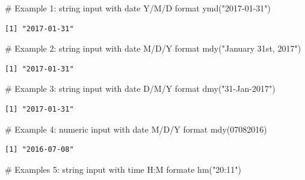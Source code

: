 \documentclass[
  letterpaper,
  DIV=11,
  numbers=noendperiod]{scrartcl}
\newenvironment{Shaded}{\begin{snugshade}}{\end{snugshade}}
\newcommand{\CommentTok}[1]{\textcolor[rgb]{0.37,0.37,0.37}{#1}}
\newcommand{\DecValTok}[1]{\textcolor[rgb]{0.68,0.00,0.00}{#1}}
\newcommand{\FunctionTok}[1]{\textcolor[rgb]{0.28,0.35,0.67}{#1}}
\newcommand{\NormalTok}[1]{\textcolor[rgb]{0.00,0.23,0.31}{#1}}
\newcommand{\StringTok}[1]{\textcolor[rgb]{0.13,0.47,0.30}{#1}}
\begin{document}
\begin{Shaded}
\begin{Highlighting}[]
\CommentTok{\# Example 1: string input with date Y/M/D format}
\FunctionTok{ymd}\NormalTok{(}\StringTok{"2017{-}01{-}31"}\NormalTok{)}
\end{Highlighting}
\end{Shaded}

\begin{verbatim}
[1] "2017-01-31"
\end{verbatim}

\begin{Shaded}
\begin{Highlighting}[]
\CommentTok{\# Example 2: string input with date M/D/Y format}
\FunctionTok{mdy}\NormalTok{(}\StringTok{"January 31st, 2017"}\NormalTok{)}
\end{Highlighting}
\end{Shaded}

\begin{verbatim}
[1] "2017-01-31"
\end{verbatim}

\begin{Shaded}
\begin{Highlighting}[]
\CommentTok{\# Example 3: string input with date D/M/Y format}
\FunctionTok{dmy}\NormalTok{(}\StringTok{"31{-}Jan{-}2017"}\NormalTok{)}
\end{Highlighting}
\end{Shaded}

\begin{verbatim}
[1] "2017-01-31"
\end{verbatim}

\begin{Shaded}
\begin{Highlighting}[]
\CommentTok{\# Example 4: numeric input with date M/D/Y format}
\FunctionTok{mdy}\NormalTok{(}\DecValTok{07082016}\NormalTok{)}
\end{Highlighting}
\end{Shaded}

\begin{verbatim}
[1] "2016-07-08"
\end{verbatim}

\begin{Shaded}
\begin{Highlighting}[]
\CommentTok{\# Examples 5: string input with time H:M formate}
\FunctionTok{hm}\NormalTok{(}\StringTok{"20:11"}\NormalTok{)}
\end{Highlighting}
\end{Shaded}
\end{document}
